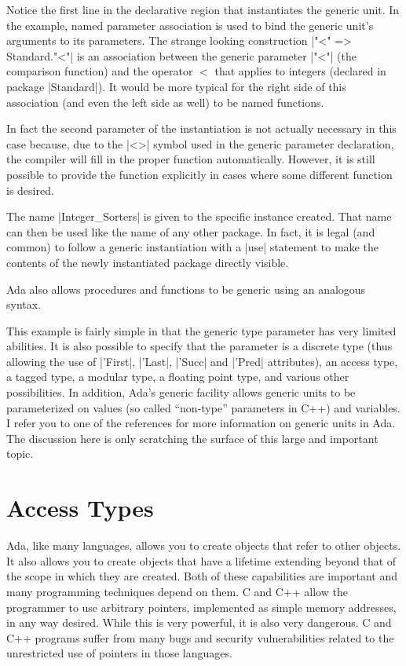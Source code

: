 Notice the first line in the declarative region that instantiates the generic unit. In the
example, named parameter association is used to bind the generic unit's arguments to its
parameters. The strange looking construction |"<" => Standard."<"| is an association between the
generic parameter |"<"| (the comparison function) and the operator $<$ that applies to integers
(declared in package |Standard|). It would be more typical for the right side of this
association (and even the left side as well) to be named functions.

In fact the second parameter of the instantiation is not actually necessary in this case
because, due to the |<>| symbol used in the generic parameter declaration, the compiler will
fill in the proper function automatically. However, it is still possible to provide the function
explicitly in cases where some different function is desired.

The name |Integer_Sorters| is given to the specific instance created. That name can then be used
like the name of any other package. In fact, it is legal (and common) to follow a generic
instantiation with a |use| statement to make the contents of the newly instantiated package
directly visible.

Ada also allows procedures and functions to be generic using an analogous syntax.

This example is fairly simple in that the generic type parameter has very limited abilities. It
is also possible to specify that the parameter is a discrete type (thus allowing the use of
|'First|, |'Last|, |'Succ| and |'Pred| attributes), an access type, a tagged type, a modular
type, a floating point type, and various other possibilities. In addition, Ada's generic
facility allows generic units to be parameterized on values (so called ``non-type'' parameters
in C++) and variables. I refer you to one of the references for more information on generic
units in Ada. The discussion here is only scratching the surface of this large and important
topic.

\section{Access Types}

Ada, like many languages, allows you to create objects that refer to other objects. It also
allows you to create objects that have a lifetime extending beyond that of the scope in which
they are created. Both of these capabilities are important and many programming techniques
depend on them. C and C++ allow the programmer to use arbitrary pointers, implemented as simple
memory addresses, in any way desired. While this is very powerful, it is also very dangerous. C
and C++ programs suffer from many bugs and security vulnerabilities related to the unrestricted
use of pointers in those languages.

